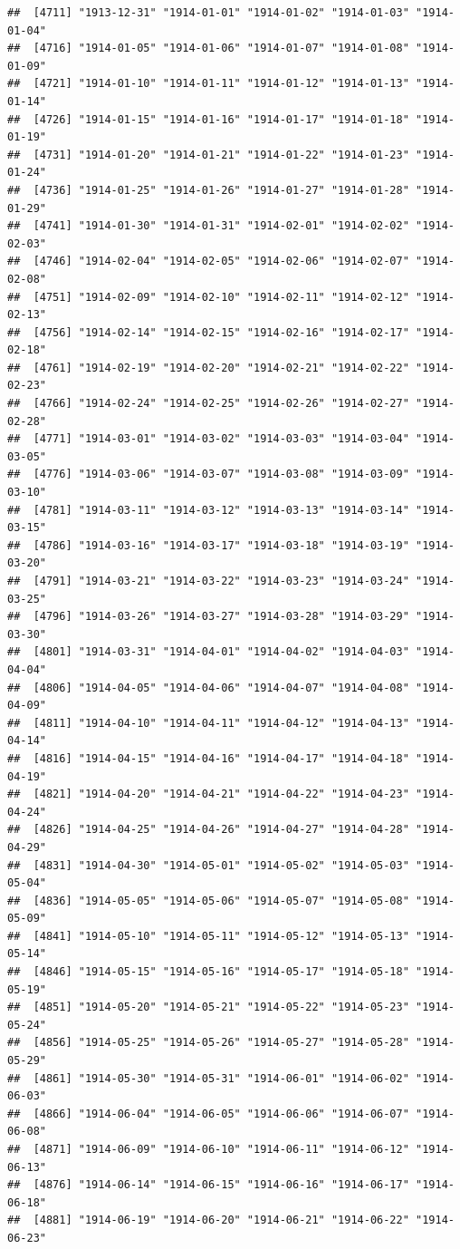 \documentclass{article}\usepackage[]{graphicx}\usepackage[]{color}
\makeatletter
\newenvironment{kframe}{%
 \def\at@end@of@kframe{}%
 \ifinner\ifhmode%
  \def\at@end@of@kframe{\end{minipage}}%
  \begin{minipage}{\columnwidth}%
 \fi\fi%
 \def\FrameCommand##1{\hskip\@totalleftmargin \hskip-\fboxsep
 \colorbox{shadecolor}{##1}\hskip-\fboxsep
     \hskip-\linewidth \hskip-\@totalleftmargin \hskip\columnwidth}%
 \MakeFramed {\advance\hsize-\width
   \@totalleftmargin\z@ \linewidth\hsize
   \@setminipage}}%
 {\par\unskip\endMakeFramed%
 \at@end@of@kframe}
\newenvironment{knitrout}{}{} %
\makeatother
\begin{document}
\begin{description}
\begin{knitrout}
\begin{kframe}
\begin{verbatim}
##  [4711] "1913-12-31" "1914-01-01" "1914-01-02" "1914-01-03" "1914-01-04"
##  [4716] "1914-01-05" "1914-01-06" "1914-01-07" "1914-01-08" "1914-01-09"
##  [4721] "1914-01-10" "1914-01-11" "1914-01-12" "1914-01-13" "1914-01-14"
##  [4726] "1914-01-15" "1914-01-16" "1914-01-17" "1914-01-18" "1914-01-19"
##  [4731] "1914-01-20" "1914-01-21" "1914-01-22" "1914-01-23" "1914-01-24"
##  [4736] "1914-01-25" "1914-01-26" "1914-01-27" "1914-01-28" "1914-01-29"
##  [4741] "1914-01-30" "1914-01-31" "1914-02-01" "1914-02-02" "1914-02-03"
##  [4746] "1914-02-04" "1914-02-05" "1914-02-06" "1914-02-07" "1914-02-08"
##  [4751] "1914-02-09" "1914-02-10" "1914-02-11" "1914-02-12" "1914-02-13"
##  [4756] "1914-02-14" "1914-02-15" "1914-02-16" "1914-02-17" "1914-02-18"
##  [4761] "1914-02-19" "1914-02-20" "1914-02-21" "1914-02-22" "1914-02-23"
##  [4766] "1914-02-24" "1914-02-25" "1914-02-26" "1914-02-27" "1914-02-28"
##  [4771] "1914-03-01" "1914-03-02" "1914-03-03" "1914-03-04" "1914-03-05"
##  [4776] "1914-03-06" "1914-03-07" "1914-03-08" "1914-03-09" "1914-03-10"
##  [4781] "1914-03-11" "1914-03-12" "1914-03-13" "1914-03-14" "1914-03-15"
##  [4786] "1914-03-16" "1914-03-17" "1914-03-18" "1914-03-19" "1914-03-20"
##  [4791] "1914-03-21" "1914-03-22" "1914-03-23" "1914-03-24" "1914-03-25"
##  [4796] "1914-03-26" "1914-03-27" "1914-03-28" "1914-03-29" "1914-03-30"
##  [4801] "1914-03-31" "1914-04-01" "1914-04-02" "1914-04-03" "1914-04-04"
##  [4806] "1914-04-05" "1914-04-06" "1914-04-07" "1914-04-08" "1914-04-09"
##  [4811] "1914-04-10" "1914-04-11" "1914-04-12" "1914-04-13" "1914-04-14"
##  [4816] "1914-04-15" "1914-04-16" "1914-04-17" "1914-04-18" "1914-04-19"
##  [4821] "1914-04-20" "1914-04-21" "1914-04-22" "1914-04-23" "1914-04-24"
##  [4826] "1914-04-25" "1914-04-26" "1914-04-27" "1914-04-28" "1914-04-29"
##  [4831] "1914-04-30" "1914-05-01" "1914-05-02" "1914-05-03" "1914-05-04"
##  [4836] "1914-05-05" "1914-05-06" "1914-05-07" "1914-05-08" "1914-05-09"
##  [4841] "1914-05-10" "1914-05-11" "1914-05-12" "1914-05-13" "1914-05-14"
##  [4846] "1914-05-15" "1914-05-16" "1914-05-17" "1914-05-18" "1914-05-19"
##  [4851] "1914-05-20" "1914-05-21" "1914-05-22" "1914-05-23" "1914-05-24"
##  [4856] "1914-05-25" "1914-05-26" "1914-05-27" "1914-05-28" "1914-05-29"
##  [4861] "1914-05-30" "1914-05-31" "1914-06-01" "1914-06-02" "1914-06-03"
##  [4866] "1914-06-04" "1914-06-05" "1914-06-06" "1914-06-07" "1914-06-08"
##  [4871] "1914-06-09" "1914-06-10" "1914-06-11" "1914-06-12" "1914-06-13"
##  [4876] "1914-06-14" "1914-06-15" "1914-06-16" "1914-06-17" "1914-06-18"
##  [4881] "1914-06-19" "1914-06-20" "1914-06-21" "1914-06-22" "1914-06-23"

\end{verbatim}
\end{kframe}
\end{knitrout}
\end{description}
\end{document}
